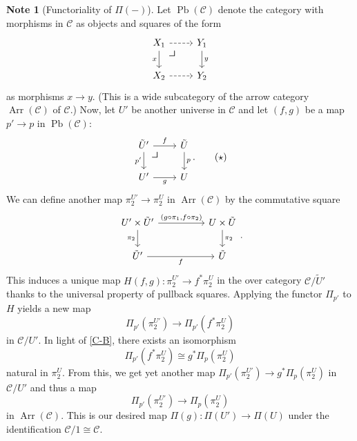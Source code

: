 \documentclass[10pt,letterpaper,cm]{nupset}
\theoremstyle{definition}
\newtheorem{note}[definition]{Note}
\theoremstyle{theorem}
\theoremstyle{remark}
\newcommand{\0}{\mathbf{0}}
\newcommand{\1}{\mathbf{1}}
\newcommand{\2}{\mathbf{2}}
\DeclareMathOperator{\Ar}{Arr}
\DeclareMathOperator{\pb}{Pb}
\renewcommand{\c}{\mathscr{C}}
\begin{document}
\begin{note}[Functoriality of $\Pi({-})$]\label{Ufunct}
Let $\pb(\c)$ denote the category with morphisms in $\c$ as objects and squares of the form 
\[
\begin{tikzcd}
X_1 \arrow[d, "x"'] \arrow[r, dashed]  \arrow[dr, phantom, "\scalebox{1.5}{\color{black}$\lrcorner$}", very near start] & Y_1 \arrow[d, "y"]  \\
X_2 \arrow[r, dashed]                & Y_2               
\end{tikzcd}
\]
 as morphisms $x\to y$.  (This is a wide subcategory of the arrow category $\Ar(\c)$ of $\c$.) Now, let $U'$ be another universe in $\c$ and let $\left(f, g\right)$ be a map $p' \to p$ in $\pb(\c)$:
\[
\label{eqn:pbk} \begin{tikzcd}
\tilde{U}' \arrow[d, "p'"'] \arrow[r, "f"]  \arrow[dr, phantom, "\scalebox{1.5}{\color{black}$\lrcorner$}", very near start] & \tilde{U} \arrow[d, "p"] \\
U' \arrow[r, "g"']                         & U                       
\end{tikzcd}. \tag{$\star$}
\]
We can define another map $\pi_2^{U'} \to \pi_2^U$ in $\Ar(\c)$ by the commutative square  
\[
\begin{tikzcd}[column sep=huge]
U'\times \tilde{U}' \arrow[d, "\pi_2"'] \arrow[r, "{\left(g\circ \pi_1, f \circ \pi_2\right)}"] & U\times \tilde{U} \arrow[d, "\pi_2"] \\
\tilde{U}' \arrow[r, "f"']                                                                      & \tilde{U}                           
\end{tikzcd}
.\] This induces a unique map $H(f,g): \pi_2^{U'} \to f^{\ast}{\pi_2^U}$ in the over category $\c/\tilde{U}'$ thanks to the universal property of pullback squares. Applying the functor $\Pi_{p'}$ to $H$ yields a new map 
$$ \Pi_{p'}\left(\pi_2^{U'}\right) \to \Pi_{p'}\left(f^{\ast}{\pi_2^U}\right) $$ 
in $\c/U'$. In light of \cref{C-B}, there exists an isomorphism  $$\Pi_{p'}\left(f^{\ast}{\pi_2^U}\right) \cong g^{\ast}\Pi_p\left( \pi_2^U\right)$$ natural in $\pi_2^U$. From this, we get yet another map $ \Pi_{p'}\left(\pi_2^{U'}\right) \to  g^{\ast}\Pi_p\left(\pi_2^U\right)$ in $\c/U'$ and thus a map $$\Pi_{p'}\left(\pi_2^{U'}\right) \to \Pi_p\left(\pi_2^U\right)$$ in $\Ar(\c)$. This is our desired map $\Pi(g): \Pi(U') \to \Pi(U) $ under the identification $\c/1 \cong \c$. 
\end{note}

\medskip
\end{document}
